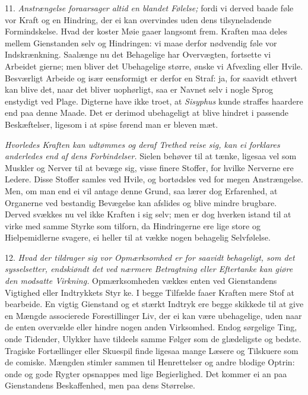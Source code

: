 \documentclass[12pt,a4paper]{article}
\newcommand{\opage}[1]{\marginnote{\footnotesize\textit{[#1]}}}
\begin{document}
11. \emph{Anstrængelse foraarsager altid en blandet Følelse;} fordi vi derved baade føle
vor Kraft og en Hindring, der ei kan overvindes uden dens tilsyneladende Formindskelse.
Hvad der koster Møie gaaer langsomt frem. Kraften maa deles mellem Gienstanden selv og
Hindringen: vi maae derfor nødvendig føle vor Indskrænkning. Saalænge nu det Behagelige har
Overvægten, fortsette vi Arbeidet gierne; men bliver det Ubehagelige større, ønske vi
Afvexling eller Hvile. Besværligt Arbeide og især eensformigt er derfor en Straf: ja, for
saavidt ethvert kan blive det,
\opage{208} naar det bliver uophørligt, saa er Navnet selv i nogle Sprog enstydigt ved Plage. Digterne
have ikke troet, at \emph{Sisyphus} kunde straffes haardere end paa denne Maade. Det er
derimod ubehageligt at blive hindret i passende Beskæftelser, ligesom i at spise førend man
er bleven mæt.

\emph{Hvorledes Kraften kan udtømmes og deraf Trethed reise sig, kan ei forklares
anderledes end af dens Forbindelser.} Sielen behøver til at tænke, ligesaa vel som Muskler
og Nerver til at bevæge sig, visse finere Stoffer, for hvilke Nerverne ere Ledere. Disse
Stoffer samles ved Hvile, og bortødsles ved for megen Anstrængelse. Men, om man end ei vil
antage denne Grund, saa lærer dog Erfarenhed, at Organerne ved bestandig Bevægelse kan
afslides og blive mindre brugbare. Derved svækkes nu vel ikke Kraften i sig selv; men er
dog hverken istand til at virke med samme Styrke som tilforn, da Hindringerne ere lige
store og Hielpemidlerne svagere, ei heller til at vække nogen behagelig Selvfølelse.

12. \emph{Hvad der tildrager sig vor Opmærksomhed er for saavidt behageligt, som det
sysselsetter, endskiøndt det ved nærmere Betragtning eller Eftertanke kan giøre den
modsatte Virkning.} Opmærksomheden vækkes enten ved Gienstandens Vigtighed eller
Indtrykkets Styr%
\opage{209}ke. I begge Tilfælde faaer Kraften mere Stof at bearbeide. En vigtig Gienstand og et
stærkt Indtryk ere begge skikkede til at give en Mængde associerede Forestillinger Liv,
der ei kan være ubehagelige, uden naar de enten overvælde eller hindre nogen anden
Virksomhed. Endog sørgelige Ting, onde Tidender, Ulykker have tildeels samme Følger som de
glædeligste og bedste. Tragiske Fortællinger eller Skuespil finde ligesaa mange Læsere og
Tilskuere som de comiske. Mængden stimler sammen til Henrettelser og andre blodige Optrin:
onde og gode Rygter opsnappes med lige Begierlighed. Det kommer ei an paa Gienstandens
Beskaffenhed, men paa dens Størrelse.
\end{document}
